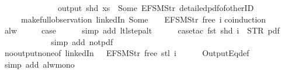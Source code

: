 \begin{isabellebody}
\ \ \ \ \ \ \ \ \ \ \ \ \ \ output\ {\isacharparenleft}shd\ xs{\isacharparenright}\ {\isasymnoteq}\ {\isacharbrackleft}Some\ {\isacharparenleft}EFSM{\isachardot}Str\ {\isacharprime}{\isacharprime}detailed{\isacharunderscore}pdf{\isacharunderscore}of{\isacharunderscore}otherID{\isacharprime}{\isacharprime}{\isacharparenright}{\isacharbrackright}{\isacharparenright}\isanewline
\ \ \ \ \ {\isacharparenleft}make{\isacharunderscore}full{\isacharunderscore}observation\ linkedIn\ {\isacharparenleft}Some\ {}{\isacharparenright}\ {\isacharparenleft}{\isacharless}{\isachargreater}{\isacharparenleft}{}\ {\isacharcolon}{\isacharequal}\ EFSM{\isachardot}Str\ {\isacharprime}{\isacharprime}free{\isacharprime}{\isacharprime}{\isacharparenright}{\isacharparenright}\ i{\isacharparenright}{\isachardoublequoteclose}\isanewline
%
\isadelimproof
%
\endisadelimproof
%
\isatagproof
{}\isamarkupfalse%
{\isacharparenleft}coinduction{\isacharparenright}\isanewline
\ \ \isamarkupfalse%
\ alw\isanewline
\ \ \isamarkupfalse%
\ \isamarkupfalse%
\ {\isacharquery}case\isanewline
\ \ \ \ \isamarkupfalse%
\ {\isacharparenleft}simp\ add{\isacharcolon}\ ltl{\isacharunderscore}step{\isacharunderscore}alt{\isacharparenright}\isanewline
\ \ \ \ \isamarkupfalse%
\ {\isacharparenleft}case{\isacharunderscore}tac\ {\isachardoublequoteopen}fst\ {\isacharparenleft}shd\ i{\isacharparenright}\ {\isacharequal}\ STR\ {\isacharprime}{\isacharprime}pdf{\isacharprime}{\isacharprime}{\isachardoublequoteclose}{\isacharparenright}\isanewline
\ \ \ \ \ \isamarkupfalse%
\isanewline
\ \ \ \ \ \isamarkupfalse%
\ {\isacharparenleft}simp\ add{\isacharcolon}\ not{\isacharunderscore}pdf{\isacharunderscore}{}\ {\isacharparenright}\isanewline
\ \ \ \ \isamarkupfalse%
\ no{\isacharunderscore}output{\isacharunderscore}none{\isacharbrackleft}of\ linkedIn\ {\isachardoublequoteopen}{\isacharparenleft}{\isacharless}{\isachargreater}{\isacharparenleft}{}\ {\isacharcolon}{\isacharequal}\ EFSM{\isachardot}Str\ {\isacharprime}{\isacharprime}free{\isacharprime}{\isacharprime}{\isacharparenright}{\isacharparenright}{\isachardoublequoteclose}\ {\isachardoublequoteopen}{\isacharparenleft}stl\ i{\isacharparenright}{\isachardoublequoteclose}{\isacharbrackright}\isanewline
\ \ \ \ \isamarkupfalse%
\ OutputEq{\isacharunderscore}def\isanewline
\ \ \ \ \ \isamarkupfalse%
\ {\isacharparenleft}simp\ add{\isacharcolon}\ alw{\isacharunderscore}mono{\isacharparenright}\isanewline

\end{isabellebody}
